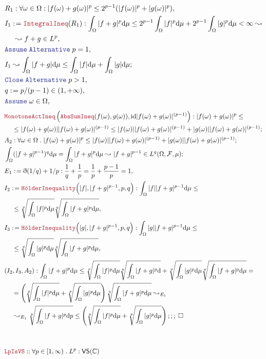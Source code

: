 \documentclass[12pt]{article}
\newcommand{\LOGIC}[1]{\textcolor{Blue}{\mathtt{#1}}}
\newcommand{\THM}[1]{\textcolor{Maroon}{\mathtt{#1}}}
\renewcommand{\.}{\; . \;}
\newcommand{\de}{: \kern 0.1pc =}
\newcommand{\NewLine}{\\ & \kern 1pc}
\newcommand{\Co}{\mathbb{C} }
\newcommand{\A}{\LOGIC{Assume} \;}
\newcommand{\QED}{\; \square}
\newcommand{\ByDef}{\eth}
\newcommand{\Alt}{\LOGIC{Alternative} \;}
\newcommand{\CL}{\LOGIC{Close} \;}
\newcommand{\F}{\mathcal{F}}
\renewcommand{\O}{\Omega}
\begin{document}
\begin{align*}
& R_1 : \forall \omega \in \O : |f(\omega) +  g(\omega)|^p \le 2^{p-1}(|f(\omega) |^p + |g(\omega)|^p),\\
& I_1 \de  \THM{IntegralIneq}(R_1) : \int_\O |f + g|^p\mathrm{d}\mu \le 2^{p-1}\int_\O |f|^p \mathrm{d}\mu + 2^{p-1}\int_\O |g|^p \mathrm{d}\mu  < \infty \leadsto       
\NewLine
\leadsto f + g \in L^p , \\
& \A \Alt p = 1, \\
&  I_1 \leadsto \int_\O |f + g|\mathrm{d}\mu \le \int_\O |f|\mathrm{d}\mu + \int_\O |g|\mathrm{d}\mu; \\
&  \CL \Alt p > 1, \\
&   q \de p/(p - 1) \in (1, + \infty), \\
&   \A \omega \in \Omega ,  \\
\end{align*}
\newpage    
\begin{align*}
&  \THM{MonotoneActIneq}\left (\THM{AbsSumIneq}(f(\omega),g(\omega)),\mathrm{id}|f(\omega) + g(\omega)|^{(p-1)} \right ) : |f(\omega) + g(\omega)|^p \le   \NewLine 
\le |f(\omega) + g(\omega)||f(\omega) + g(\omega)|^{(p-1)}
   \le  |f(\omega)||f(\omega) + g(\omega)|^{(p-1)} + |g(\omega)||f(\omega) + g(\omega)|^{(p-1)} ;                     \\
 &  A_2 : \forall \omega \in \O \.  |f(\omega) + g(\omega)|^p \le    
|f(\omega)||f(\omega) + g(\omega)|^{(p-1)} + |g(\omega)||f(\omega) + g(\omega)|^{(p-1)} ; 
            \\
&   \int_\O  (|f + g|^{p - 1})^q \mathrm{d}\mu = \int_\O |f + g|^p \mathrm{d}\mu 
 \leadsto |f + g|^{p - 1} \in L^q(\O,\F,\mu)       ; \\
 & E_1 \de \ByDef(1/q) + 1/p : \frac{1}{q} + \frac{1}{p} =  \frac{1}{p} + \frac{p -1 }{p } = 1, \\
 &  I_2 \de \THM{H\ddot olderInequality}\Big (|f|,|f + g|^{p - 1},p,q \Big ) :
 \int_\O |f||f + g|^{p - 1} \mathrm{d}\mu \le 
 \NewLine 
 \le \sqrt[p]{\int_\O |f|^p \mathrm{d}\mu} \sqrt[q]{\int_\O |f + g|^{p}\mathrm{d}\mu},         
       \\   
 &  I_3 \de \THM{H\ddot olderInequality}\Big (|g|,|f + g|^{p - 1},p,q \Big ) :
 \int_\O |g||f + g|^{p - 1} \mathrm{d}\mu \le 
 \NewLine 
 \le \sqrt[p]{\int_\O |g|^p \mathrm{d}\mu} \sqrt[q]{\int_\O |f + g|^{p}\mathrm{d}\mu},\\         
  & (I_2,I_3,A_2) : \int_\O |f + g|^p\mathrm{d}{\mu} \le  
  \sqrt[p]{\int_\O |f|^p \mathrm{d}\mu} \sqrt[q]{\int_\O |f + g|^{p}\mathrm{d}}
  +
  \sqrt[p]{\int_\O |g|^p \mathrm{d}\mu} \sqrt[q]{\int_\O |f + g|^{p}\mathrm{d}\mu}   
   = 
   \NewLine   
   =   
   \left( \sqrt[p]{\int_\O |f|^p \mathrm{d}\mu} 
  +
  \sqrt[p]{\int_\O |g|^p \mathrm{d}\mu} \right) \sqrt[q]{\int_\O |f + g|^{p}\mathrm{d}\mu} 
    \leadsto_{E_1} \NewLine 
    \leadsto_{E_1} \sqrt[p]{\int_\O |f + g|^p\mathrm{d}p} \le   \left( \sqrt[p]{\int_\O |f|^p \mathrm{d}\mu} 
  +
  \sqrt[p]{\int_\O |g|^p \mathrm{d}\mu} \right) ;;;\QED   \\  
  \\ \\
 & \THM{LpIsVS} :: \forall p \in [1,\infty) \. L^p : \mathsf{VS}(\Co) \\
\end{align*}
\newpage    
\end{document}
